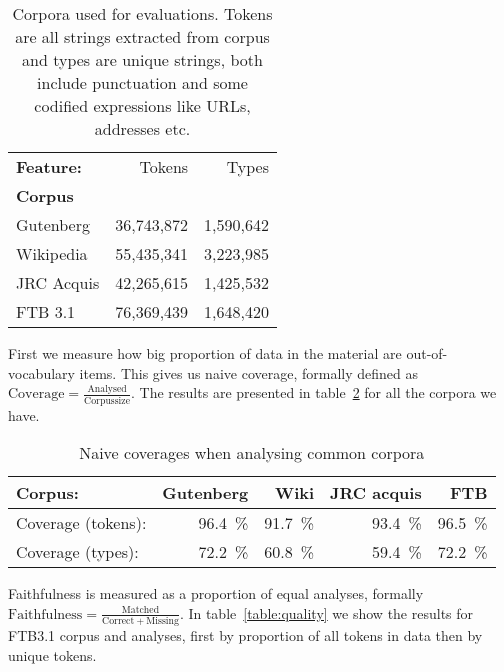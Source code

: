 \documentclass[a4paper,12pt]{article}
\begin{document}
\begin{table}
    \begin{scriptsize}
  \centering
    \begin{tabular}{|l|r|r|}
        \hline
        \bf Feature: & Tokens     & Types     \\
        \bf Corpus   &            &           \\
        \hline
        Gutenberg    & 36,743,872 & 1,590,642 \\
        Wikipedia    & 55,435,341 & 3,223,985 \\
        JRC Acquis   & 42,265,615 & 1,425,532 \\
        FTB 3.1      & 76,369,439 & 1,648,420 \\
        \hline
    \end{tabular}
  \caption{Corpora used for evaluations. Tokens are all strings extracted from
      corpus and types are unique strings, both include punctuation and some
      codified expressions like URLs, addresses etc.
  \label{table:corpora}}
  \end{scriptsize}
\end{table}

First we measure how big proportion of data in the material are
out-of-vocabulary items. This gives us naive coverage, formally defined as
$\mathrm{Coverage} = \frac{\mathrm{Analysed}}{\mathrm{Corpus size}}$.
The results are presented in table~\ref{table:coverage} for all the
corpora we have.

\begin{table}
    \begin{scriptsize}
    \centering
    \begin{tabular}{|l|r|r|r|r|}
        \hline
        Corpus:            & \bf Gutenberg & \bf Wiki & \bf JRC acquis & \bf FTB \\
        \hline
        Coverage (tokens): & 96.4~\%       & 91.7~\%  & 93.4~\%        & 96.5~\% \\
        Coverage (types):  & 72.2~\%       & 60.8~\%  & 59.4~\%        & 72.2~\% \\
        \hline
    \end{tabular}
    \caption{Naive coverages when analysing common corpora
    \label{table:coverage}}
  \end{scriptsize}
\end{table}

Faithfulness is measured as a proportion of equal analyses, formally $\mathrm{Faithfulness} =
\frac{\mathrm{Matched}}{\mathrm{Correct} + \mathrm{Missing}}$. In
table~\ref{table:quality} we show the results for FTB3.1 corpus and
analyses, first by proportion of all tokens in data then by unique tokens.
\end{document}

